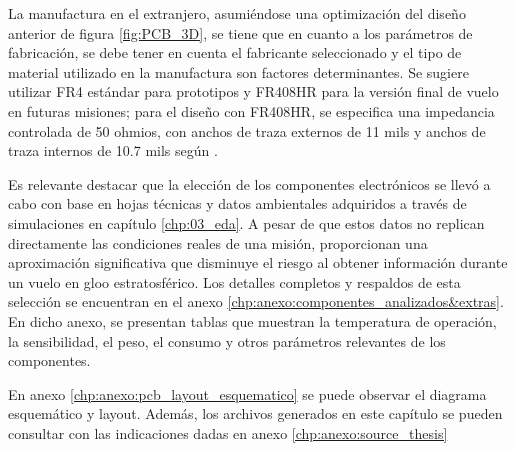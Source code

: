 La manufactura en el extranjero, asumiéndose una optimización del diseño anterior de figura \ref{fig:PCB_3D},  se tiene que en cuanto a los parámetros de fabricación, se debe tener en cuenta el fabricante seleccionado y el tipo de material utilizado en la manufactura son factores determinantes. Se sugiere utilizar FR4 estándar para prototipos y FR408HR para la versión final de vuelo en futuras misiones; para el diseño con FR408HR, se especifica una impedancia controlada de 50 ohmios, con anchos de traza externos de 11 mils y anchos de traza internos de 10.7 mils según \cite{pycubed}.

\newpage

Es relevante destacar que la elección de los componentes electrónicos se llevó a cabo con base en hojas técnicas y datos ambientales adquiridos a través de simulaciones en capítulo \ref{chp:03_eda}. A pesar de que estos datos no replican directamente las condiciones reales de una misión, proporcionan una aproximación significativa que disminuye el riesgo al obtener información durante un vuelo en gloo estratosférico. Los detalles completos y respaldos de esta selección se encuentran en el anexo \ref{chp:anexo:componentes_analizados&extras}. En dicho anexo, se presentan tablas que muestran la temperatura de operación, la sensibilidad, el peso, el consumo y otros parámetros relevantes de los componentes. 

En anexo \ref{chp:anexo:pcb_layout_esquematico} se puede observar el diagrama esquemático y layout. Además, los archivos generados en este capítulo se pueden consultar con las indicaciones dadas en anexo \ref{chp:anexo:source_thesis}

